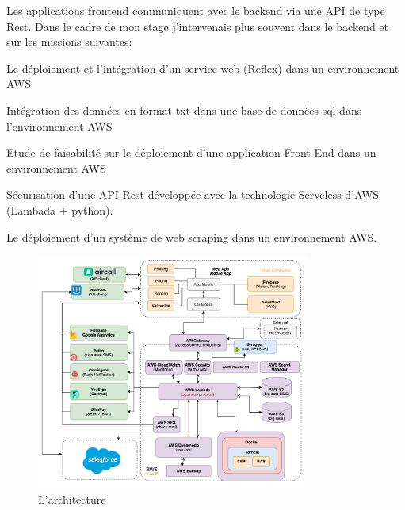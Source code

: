 Les applications frontend communiquent avec le backend via une API de type Rest.
Dans le cadre de mon stage j’intervenais plus souvent dans le backend et sur les missions suivantes:

\begin{list}{•}
	\item Le déploiement et l’intégration d’un service web (Reflex) dans un environnement AWS
	\item Intégration des données en format txt dans une base de données sql dans l’environnement AWS
	\item Etude de faisabilité sur le déploiement d’une application Front-End dans un environnement AWS
	\item Sécurisation d’une API Rest développée avec la technologie Serveless d’AWS (Lambada + python).
	\item Le déploiement d’un système de web scraping dans un environnement AWS.
\end{list}
\begin{figure}[!th]
\centering
\includegraphics[width=0.8\textwidth]{Figures/architecture}
\decoRule
\caption[L'architecture]{L'architecture}
\label{fig:architecture}
\end{figure}





